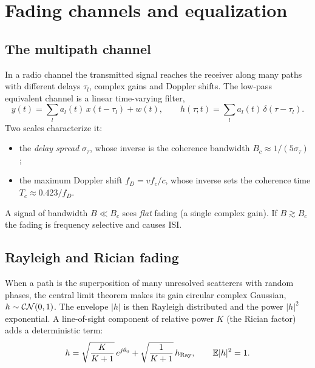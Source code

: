 \chapter{Fading channels and equalization}\label{ch:fading}

\section{The multipath channel}
In a radio channel the transmitted signal reaches the receiver along many paths with
different delays $\tau_l$, complex gains and Doppler shifts. The low-pass equivalent channel is
a linear time-varying filter,
\begin{equation}
  y(t)=\sum_l a_l(t)\,x(t-\tau_l)+w(t),\qquad h(\tau;t)=\sum_l a_l(t)\,\delta(\tau-\tau_l).
\end{equation}
Two scales characterize it:
\begin{itemize}
  \item the \emph{delay spread} $\sigma_\tau$, whose inverse is the coherence bandwidth
  $B_c\approx1/(5\sigma_\tau)$;
  \item the maximum Doppler shift $f_D=v f_c/c$, whose inverse sets the coherence time
  $T_c\approx0.423/f_D$.
\end{itemize}
A signal of bandwidth $B\ll B_c$ sees \emph{flat} fading (a single complex gain). If $B\gtrsim
B_c$ the fading is frequency selective and causes ISI.

\section{Rayleigh and Rician fading}
When a path is the superposition of many unresolved scatterers with random phases, the
central limit theorem makes its gain circular complex Gaussian, $h\sim\mathcal{CN}(0,1)$. The envelope
$|h|$ is then Rayleigh distributed and the power $|h|^2$ exponential. A line-of-sight
component of relative power $K$ (the Rician factor) adds a deterministic term:
\begin{equation}
  h=\sqrt{\frac{K}{K+1}}\,e^{j\theta_0}+\sqrt{\frac{1}{K+1}}\,h_{\mathrm{Ray}},\qquad \mathbb{E}|h|^2=1 .
\end{equation}

